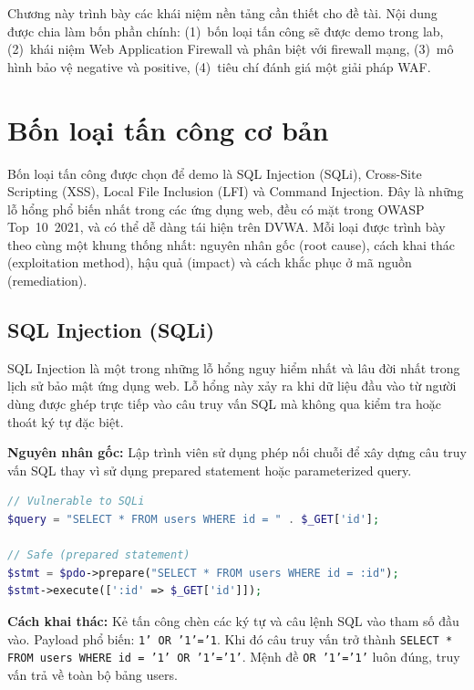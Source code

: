 \documentclass[12pt,a4paper,twoside]{report}
\begin{document}
Chương này trình bày các khái niệm nền tảng cần thiết cho đề tài. Nội dung được chia làm bốn phần chính: (1)~bốn loại tấn công sẽ được demo trong lab, (2)~khái niệm Web Application Firewall và phân biệt với firewall mạng, (3)~mô hình bảo vệ negative và positive, (4)~tiêu chí đánh giá một giải pháp WAF.

\section{Bốn loại tấn công cơ bản}

Bốn loại tấn công được chọn để demo là SQL Injection (SQLi), Cross-Site Scripting (XSS), Local File Inclusion (LFI) và Command Injection. Đây là những lỗ hổng phổ biến nhất trong các ứng dụng web, đều có mặt trong OWASP Top~10~2021, và có thể dễ dàng tái hiện trên DVWA. Mỗi loại được trình bày theo cùng một khung thống nhất: nguyên nhân gốc (root cause), cách khai thác (exploitation method), hậu quả (impact) và cách khắc phục ở mã nguồn (remediation).

\subsection{SQL Injection (SQLi)}

SQL Injection là một trong những lỗ hổng nguy hiểm nhất và lâu đời nhất trong lịch sử bảo mật ứng dụng web. Lỗ hổng này xảy ra khi dữ liệu đầu vào từ người dùng được ghép trực tiếp vào câu truy vấn SQL mà không qua kiểm tra hoặc thoát ký tự đặc biệt.

\textbf{Nguyên nhân gốc:} Lập trình viên sử dụng phép nối chuỗi để xây dựng câu truy vấn SQL thay vì sử dụng prepared statement hoặc parameterized query.

\begin{lstlisting}[language=PHP,caption=SQL Injection -- vulnerable vs safe code]
// Vulnerable to SQLi
$query = "SELECT * FROM users WHERE id = " . $_GET['id'];

// Safe (prepared statement)
$stmt = $pdo->prepare("SELECT * FROM users WHERE id = :id");
$stmt->execute([':id' => $_GET['id']]);
\end{lstlisting}

\textbf{Cách khai thác:} Kẻ tấn công chèn các ký tự và câu lệnh SQL vào tham số đầu vào. Payload phổ biến: \texttt{1' OR '1'='1}. Khi đó câu truy vấn trở thành \texttt{SELECT * FROM users WHERE id = '1' OR '1'='1'}. Mệnh đề \texttt{OR '1'='1'} luôn đúng, truy vấn trả về toàn bộ bảng users.
\end{document}
